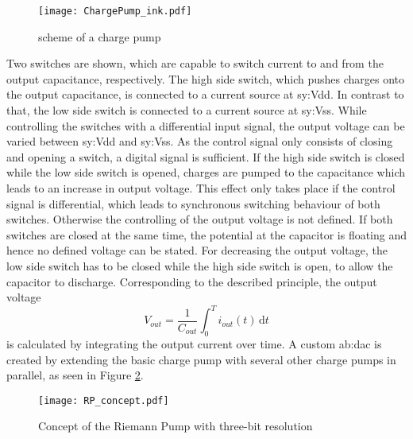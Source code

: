 
\begin{figure}[ht]
	\centering
  \texttt{[image: ChargePump\_ink.pdf]}
	\caption{scheme of a charge pump}
	\label{fig:ChargePump}
\end{figure}

Two switches are shown, which are capable to switch current to and from the output capacitance, respectively.
The high side switch, which pushes charges onto the output capacitance, is connected to a current source at \gls{sy:Vdd}.
In contrast to that, the low side switch is connected to a current source at \gls{sy:Vss}.
While controlling the switches with a differential input signal, the output voltage can be varied between \gls{sy:Vdd} and \gls{sy:Vss}.
As the control signal only consists of closing and opening a switch, a digital signal is sufficient.
If the high side switch is closed while the low side switch is opened, charges are pumped to the capacitance which leads to an increase in output voltage.
This effect only takes place if the control signal is differential, which leads to synchronous switching behaviour of both switches.
Otherwise the controlling of the output voltage is not defined.
If both switches are closed at the same time, the potential at the capacitor is floating and hence no defined voltage can be stated.
For decreasing the output voltage, the low side switch has to be closed while the high side switch is open, to allow the capacitor to discharge.
Corresponding to the described principle, the output voltage
\begin{equation}
	V_{out} = \frac{1}{C_{out}}{ \int_0^T \! i_{out}(t) \, \mathrm{d}t}
\end{equation} %
 is calculated by integrating the output current over time.
A custom \gls{ab:dac} is created by extending the basic charge pump with several other charge pumps in parallel, as seen in Figure \ref{fig:RiemannPumpConcept}.

\begin{figure}[H]
	\centering
  \texttt{[image: RP\_concept.pdf]}
	\caption{Concept of the Riemann Pump with three-bit resolution}
	\label{fig:RiemannPumpConcept}
\end{figure}

